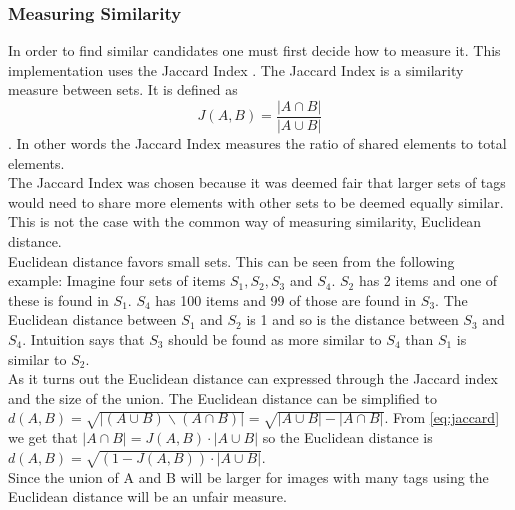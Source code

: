 \documentclass[]{article}
\begin{document}
\subsubsection{Measuring Similarity}
\label{sec:sim}
In order to find similar candidates one must first decide how to measure it. This implementation uses the Jaccard Index \cite{jaccard1912distribution}. The Jaccard Index is a similarity measure between sets. It is defined as
\begin{equation}
\label{eq:jaccard}
J(A,B) = \frac{|A \cap B|}{|A \cup B|}
\end{equation}
. In other words the Jaccard Index measures the ratio of shared elements to total elements.\\
The Jaccard Index was chosen because it was deemed fair that larger sets of tags would need to share more elements with other sets to be deemed equally similar. This is not the case with the common way of measuring similarity, Euclidean distance.\\
Euclidean distance favors small sets. This can be seen from the following example: Imagine four sets of items $S_1, S_2, S_3$ and $S_4$. $S_2$ has 2 items and one of these is found in $S_1$. $S_4$ has 100 items and 99 of those are found in $S_3$. The Euclidean distance between $S_1$ and $S_2$ is 1 and so is the distance between $S_3$ and $S_4$. Intuition says that $S_3$ should be found as more similar to $S_4$ than $S_1$ is similar to $S_2$.\\
As it turns out the Euclidean distance can expressed through the Jaccard index and the size of the union. The Euclidean distance can be simplified to $d(A,B) = \sqrt{|(A \cup B) \backslash (A \cap B)|} = \sqrt{|A \cup B| - |A \cap B|}$. From \autoref{eq:jaccard} we get that $|A \cap B| = J(A,B) \cdot |A \cup B|$ so the Euclidean distance is $d(A,B) = \sqrt{(1 - J(A,B)) \cdot |A \cup B|}$.\\
Since the union of A and B will be larger for images with many tags using the Euclidean distance will be an unfair measure.
\end{document}
